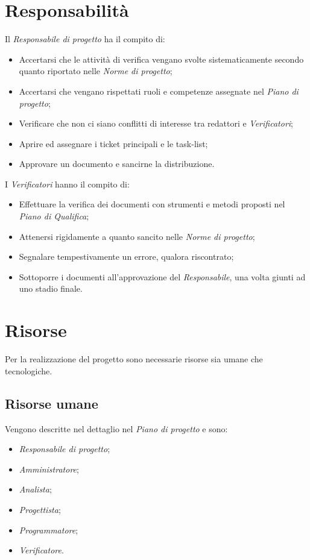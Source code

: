 \documentclass[a4paper]{report}
\begin{document}
		\section{Responsabilità}
			Il \emph{Responsabile di progetto} ha il compito di:
			\begin{itemize}
				\item Accertarsi che le attività di verifica vengano svolte sistematicamente secondo quanto 
				riportato nelle \emph{Norme di progetto};
				\item Accertarsi che vengano rispettati ruoli e competenze assegnate nel \emph{Piano di progetto};
				\item Verificare che non ci siano conflitti di interesse tra redattori e \emph{Verificatori};
				\item Aprire ed assegnare i ticket principali e le task-list;
				\item Approvare un documento e sancirne la distribuzione.
			\end{itemize}
			I \emph{Verificatori} hanno il compito di:
			\begin{itemize}
				\item Effettuare la verifica dei documenti con strumenti e metodi proposti nel \emph{Piano di Qualifica};
				\item Attenersi rigidamente a quanto sancito nelle \emph{Norme di progetto};
				\item Segnalare tempestivamente un errore, qualora riscontrato;
				\item Sottoporre i documenti all'approvazione del \emph{Responsabile}, una volta giunti ad uno stadio finale.
			\end{itemize}
		\section{Risorse}
			Per la realizzazione del progetto sono necessarie risorse sia umane che tecnologiche.
			\subsection{Risorse umane}
				Vengono descritte nel dettaglio nel \emph{Piano di progetto} e sono:
				\begin{itemize}
					\item \emph{Responsabile di progetto};
					\item \emph{Amministratore};
					\item \emph{Analista};
					\item \emph{Progettista};
					\item \emph{Programmatore};
					\item \emph{Verificatore}.
				\end{itemize}
\end{document}

